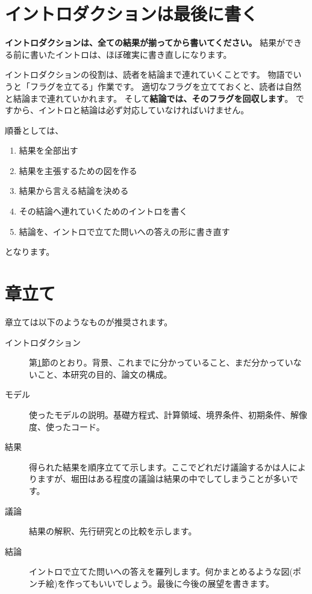 \section{イントロダクションは最後に書く}
\label{sec:guide_intro}

\textbf{イントロダクションは、全ての結果が揃ってから書いてください。}
結果ができる前に書いたイントロは、ほぼ確実に書き直しになります。

イントロダクションの役割は、読者を結論まで連れていくことです。
物語でいうと「フラグを立てる」作業です。
適切なフラグを立てておくと、読者は自然と結論まで連れていかれます。
そして\textbf{結論では、そのフラグを回収します}。
ですから、イントロと結論は必ず対応していなければいけません。

順番としては、
\begin{enumerate}
  \item 結果を全部出す
  \item 結果を主張するための図を作る
  \item 結果から言える結論を決める
  \item その結論へ連れていくためのイントロを書く
  \item 結論を、イントロで立てた問いへの答えの形に書き直す
\end{enumerate}
となります。

\section{章立て}
\label{sec:guide_structure}

章立ては以下のようなものが推奨されます。

\begin{description}
  \item[イントロダクション] 第\ref{sec:guide_intro}節のとおり。背景、これまでに分かっていること、まだ分かっていないこと、本研究の目的、論文の構成。
  \item[モデル] 使ったモデルの説明。基礎方程式、計算領域、境界条件、初期条件、解像度、使ったコード。
  \item[結果] 得られた結果を順序立てて示します。ここでどれだけ議論するかは人によりますが、堀田はある程度の議論は結果の中でしてしまうことが多いです。
  \item[議論] 結果の解釈、先行研究との比較を示します。
  \item[結論] イントロで立てた問いへの答えを羅列します。何かまとめるような図(ポンチ絵)を作ってもいいでしょう。最後に今後の展望を書きます。
\end{description}

